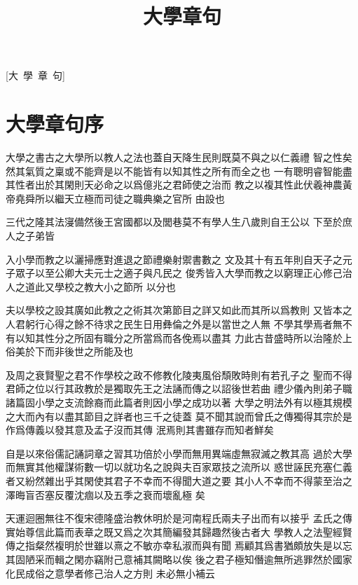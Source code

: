 \documentclass{zhvt-classic}
\title{大學章句}
\begin{document}
[大~學~章~句]

\cleardoublepage

\setcounter{page}{1}
\tableofcontents

\mainmatter

\chapter*{大學章句序}

大學之書古之大學所以教人之法也蓋自天降生\ju 民則既莫不與之以仁義禮
智之性矣然其氣質之稟或不能齊是以不能皆有以知其性之所有而全之也
一有聰明睿智能盡其性者出於其閑則天必命之以爲億兆之君師使之治而
教之以複其性此伏羲神農黃帝堯舜所以繼天立極而司徒之職典樂之官所
由設也

三代之隆其法寖備然後王宮國都以及閭巷莫不有學人生八歲則自王公以
下至於庶人之子弟皆

入小學而教之以灑掃應對進退之節禮樂射禦書數之
文及其十有五年則自天子之元子眾子以至公卿大夫元士之適子與凡民之
俊秀皆入大學而教之以窮理正心修己治人之道此又學校之教大小之節所
以分也

夫以學校之設其廣如此教之之術其次第節目之詳又如此而其所以爲教則
又皆本之人君躬行心得之餘不待求之民生日用彝倫之外是以當世之人無
不學其學焉者無不有以知其性分之所固有職分之所當爲而各俛焉以盡其
力此古昔盛時所以治隆於上俗美於下而非後世之所能及也

及周之衰賢聖之君不作學校之政不修教化陵夷風俗頹敗時則有若孔子之
聖而不得君師之位以行其政教於是獨取先王之法誦而傳之以詔後世若曲
禮少儀內則弟子職諸篇固小學之支流餘裔而此篇者則因小學之成功以著
大學之明法外有以極其規模之大而內有以盡其節目之詳者也三千之徒蓋
莫不聞其說而曾氏之傳獨得其宗於是作爲傳義以發其意及孟子沒而其傳
泯焉則其書雖存而知者鮮矣

自是以來俗儒記誦詞章之習其功倍於小學而無用異端虛無寂滅之教其高
過於大學而無實其他權謀術數一切以就功名之說與夫百家眾技之流所以
惑世誣民充塞仁義者又紛然雜出乎其閑使其君子不幸而不得聞大道之要
其小人不幸而不得蒙至治之澤晦盲否塞反覆沈痼以及五季之衰而壞亂極
矣

天運迴圈無往不復宋德隆盛治教休明於是河南程氏兩夫子出而有以接乎
孟氏之傳實始尊信此篇而表章之既又爲之次其簡編發其歸趣然後古者大
學教人之法聖經賢傳之指粲然複明於世雖以熹之不敏亦幸私淑而與有聞
焉顧其爲書猶頗放失是以忘其固陋采而輯之閑亦竊附己意補其闕略以俟
後之君子極知僭逾無所逃罪然於國家化民成俗之意學者修己治人之方則
未必無小補云
\end{document}
